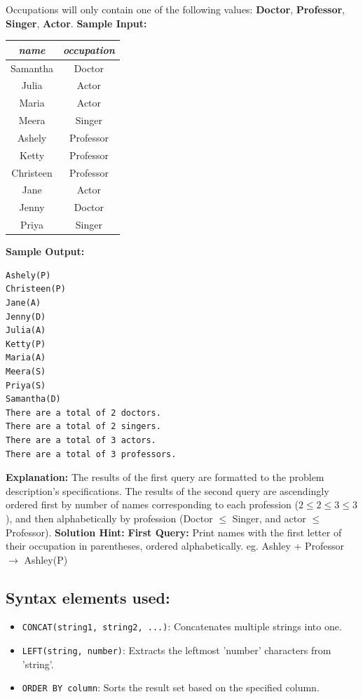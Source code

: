 \documentclass[12pt,a4paper]{article}
\renewcommand{\arraystretch}{1.5} %
\begin{document}
Occupations will only contain one of the following values: \textbf{Doctor}, \textbf{Professor}, \textbf{Singer}, \textbf{Actor}.
\textbf{Sample Input:}
\begin{table}[H]
\centering 
\renewcommand{\arraystretch}{1.3}
\begin{tabular}{|c|c|} \hline
\textit{name} & \textit{occupation} \\ \hline
Samantha & Doctor \\ \hline
Julia  & Actor \\ \hline
Maria   & Actor \\ \hline
Meera    & Singer \\ \hline
Ashely & Professor \\ \hline
Ketty  & Professor \\ \hline
Christeen & Professor \\ \hline
Jane  & Actor \\ \hline
Jenny & Doctor \\ \hline
Priya  & Singer \\ \hline
\end{tabular}
\end{table}
\textbf{Sample Output:}
\begin{verbatim}
Ashely(P)
Christeen(P)
Jane(A)
Jenny(D)
Julia(A)
Ketty(P)
Maria(A)
Meera(S)
Priya(S)
Samantha(D)
There are a total of 2 doctors.
There are a total of 2 singers.
There are a total of 3 actors.
There are a total of 3 professors.
\end{verbatim}
\textbf{Explanation:}
The results of the first query are formatted to the problem description's specifications. \newline
The results of the second query are ascendingly ordered first by number of names corresponding to each profession ($2\leqslant 2\leqslant 3\leqslant 3$), and then alphabetically by profession (Doctor $\leqslant$  Singer, and actor $\leqslant$  Professor).
\newline
\textbf{Solution Hint: }
\newline
\textbf{First Query:}
Print names with the first letter of their occupation in parentheses, ordered alphabetically.
\newline
eg. Ashley + Professor $\rightarrow$ Ashley(P)
\subsection*{Syntax elements used:}
\begin{itemize}
    \item \texttt{CONCAT(string1, string2, ...)}: Concatenates multiple strings into one.
    \item \texttt{LEFT(string, number)}: Extracts the leftmost 'number' characters from 'string'.
    \item \texttt{ORDER BY column}: Sorts the result set based on the specified column.
\end{itemize}
\end{document}
